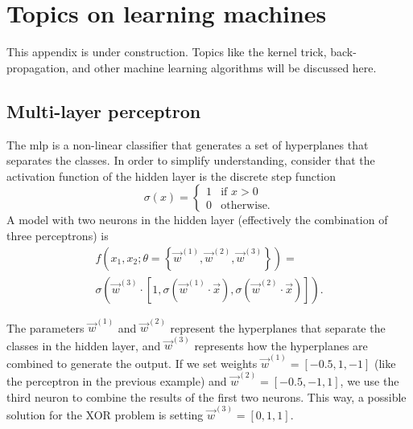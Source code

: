 \chapter{Topics on learning machines}
\label{chap:learning-machines}

This appendix is under construction.  Topics like the kernel trick, back-propagation, and
other machine learning algorithms will be discussed here.

\section{Multi-layer perceptron}
\label{sec:mlp}

The \gls{mlp} is a non-linear classifier that generates a set of hyperplanes
that separates the classes.  In order to simplify understanding, consider
that the activation function of the hidden layer is the discrete step function
\begin{equation*}
  \sigma(x) = \begin{cases}
    1 & \text{if } x > 0 \\
    0 & \text{otherwise.}
  \end{cases}
\end{equation*}
A model with two neurons in the hidden layer (effectively the combination of three
perceptrons) is
\begin{multline*}
  f(x_1, x_2; \theta = \left\{ \vec{w}^{(1)}, \vec{w}^{(2)}, \vec{w}^{(3)} \right\}) = \\
  \sigma\left(
    \vec{w}^{(3)} \cdot \left[1, \sigma(\vec{w}^{(1)} \cdot \vec{x}), \sigma(\vec{w}^{(2)} \cdot \vec{x})\right]
  \right)\text{.}
\end{multline*}

The parameters $\vec{w}^{(1)}$ and $\vec{w}^{(2)}$ represent the hyperplanes that separate
the classes in the hidden layer, and $\vec{w}^{(3)}$ represents how the hyperplanes are
combined to generate the output.  If we set weights $\vec{w}^{(1)} = [-0.5, 1, -1]$ (like the
perceptron in the previous example) and $\vec{w}^{(2)} = [-0.5, -1, 1]$, we use the third neuron
to combine the results of the first two neurons.  This way, a possible solution for the
XOR problem is setting $\vec{w}^{(3)} = [0, 1, 1]$.

